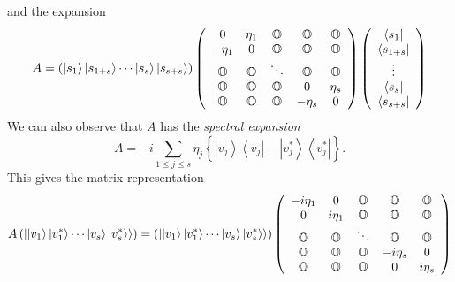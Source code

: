 and the expansion 
\begin{equation}
A=\left( \left\vert s_{1}\right\rangle \left\vert s_{1+s}\right\rangle
\cdots \left\vert s_{s}\right\rangle \left\vert s_{s+s}\right\rangle \right)
\left( 
\begin{array}{ccccc}
0 & \eta _{1} & {\Bbb O} & {\Bbb O} & {\Bbb O} \\ 
-\eta _{1} & 0 & {\Bbb O} & {\Bbb O} & {\Bbb O} \\ 
{\Bbb O} & {\Bbb O} & \ddots & {\Bbb O} & {\Bbb O} \\ 
{\Bbb O} & {\Bbb O} & {\Bbb O} & 0 & \eta _{s} \\ 
{\Bbb O} & {\Bbb O} & {\Bbb O} & -\eta _{s} & 0%
\end{array}%
\right) \left( 
\begin{array}{c}
\left\langle s_{1}\right\vert \\ 
\left\langle s_{1+s}\right\vert \\ 
\vdots \\ 
\left\langle s_{s}\right\vert \\ 
\left\langle s_{s+s}\right\vert%
\end{array}%
\right)
\end{equation}%
We can also observe that $A$ has the {\em spectral expansion} 
\begin{equation}
A=-i\sum_{1\leq j\leq s}\eta _{j}\left\{ \left\vert \stackrel{}{v_{j}}%
\right\rangle \left\langle \stackrel{}{v_{j}}\right\vert -\left\vert 
\stackrel{}{v_{j}^{\ast }}\right\rangle \left\langle \stackrel{}{v_{j}^{\ast
}}\right\vert \right\} .
\end{equation}%
This gives the matrix representation 
\begin{equation}
A\left( \left\vert \left\vert v_{1}\right\rangle \left\vert v_{1}^{\ast
}\right\rangle \cdots \left\vert v_{s}\right\rangle \left\vert v_{s}^{\ast
}\right\rangle \right\rangle \right) =\left( \left\vert \left\vert
v_{1}\right\rangle \left\vert v_{1}^{\ast }\right\rangle \cdots \left\vert
v_{s}\right\rangle \left\vert v_{s}^{\ast }\right\rangle \right\rangle
\right) \left( 
\begin{array}{ccccc}
-i\eta _{1} & 0 & {\Bbb O} & {\Bbb O} & {\Bbb O} \\ 
0 & i\eta _{1} & {\Bbb O} & {\Bbb O} & {\Bbb O} \\ 
{\Bbb O} & {\Bbb O} & \ddots & {\Bbb O} & {\Bbb O} \\ 
{\Bbb O} & {\Bbb O} & {\Bbb O} & -i\eta _{s} & 0 \\ 
{\Bbb O} & {\Bbb O} & {\Bbb O} & 0 & i\eta _{s}%
\end{array}%
\right)
\end{equation}%
